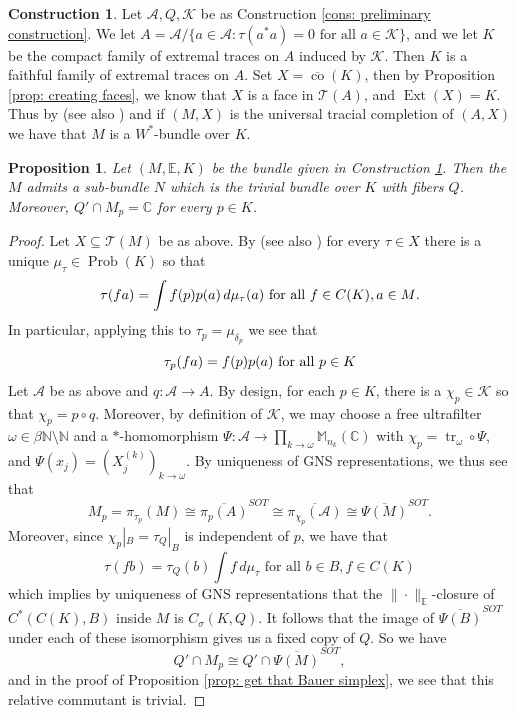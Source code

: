\documentclass[10pt]{amsart}
\newtheorem{prop}[thm]{Proposition}
\theoremstyle{definition}
\newtheorem{cons}[thm]{Construction}
\numberwithin{equation}{section}
\newcommand{\bC}{{\mathbb C}}
\newcommand{\bE}{{\mathbb E}}
\newcommand{\bM}{{\mathbb M}}
\newcommand{\bN}{{\mathbb N}}
\newcommand{\cA}{{\mathcal A}}
\newcommand{\cK}{{\mathcal K}}
\newcommand{\cT}{{\mathcal T}}
\DeclareMathOperator{\tr}{tr}
\DeclareMathOperator{\Ext}{Ext}
\DeclareMathOperator{\Prob}{Prob}
\DeclareMathOperator{\co}{co}
\begin{document}
\begin{cons}\label{cons: defining the bundle}
Let $\cA,Q,\cK$ be as Construction \ref{cons: preliminary construction}.
We let $A=\cA/\{a\in \cA:\tau(a^{*}a)=0 \text{ for all $a\in \cK$}\}$, and we let $K$ be the compact family of extremal traces on $A$ induced by $\cK$. Then $K$ is a faithful family of extremal traces on $A$. Set $X=\overline{\co}(K)$, then by Proposition \ref{prop: creating faces}, we know that $X$ is a face in $\cT(A)$, and $\Ext(X)=K$.  Thus by \cite[Theorem 3]{OzawaBundle} (see also \cite[Theorem 3.37]{TraciallyComplete}) and \cite[Proposition 3.23 (ii) and (iv)]{TraciallyComplete} if $(M,X)$ is the universal tracial completion of $(A,X)$ we have that $M$ is a $W^{*}$-bundle over $K$. 
\end{cons}

\begin{prop}\label{prop: relative commutant condition bundle}
Let $(M,\bE,K)$ be the bundle given in Construction \ref{cons: defining the bundle}. Then the $M$ admits a sub-bundle $N$ which is the trivial bundle over $K$ with fibers $Q$. Moreover, $Q'\cap M_{p}=\bC$ for every $p\in K$.     
\end{prop}

\begin{proof}
Let $X\subseteq \cT(M)$ be as above. By \cite[Theorem 3]{OzawaBundle} (see also \cite[Theorem 3.37]{TraciallyComplete}) for every $\tau\in X$ there is a unique $\mu_{\tau}\in \Prob(K)$ so that 
\[\tau(fa)=\int f(p)p(a)\,d\mu_{\tau}(a)\textnormal{ for all $f\in C(K),a\in M$}.\]
In particular, applying this to $\tau_{p}=\mu_{\delta_{p}}$ we see that 
\[\tau_{p}(fa)=f(p)p(a) \textnormal{ for all $p\in K$}\]
Let $\cA$ be as above and $q\colon \cA\to A$. By design, for each $p\in K$, there is a $\chi_{p}\in \cK$ so that $\chi_{p}=p\circ q$. Moreover, by definition of $\cK$, we may choose a free ultrafilter $\omega\in \beta\bN\setminus\bN$ and a $*$-homomorphism $\Psi\colon\cA\to \prod_{k\to\omega}\bM_{n_{k}}(\bC)$ with $\chi_{p}=\tr_{\omega}\circ \Psi$, and $\Psi(x_{j})=(X^{(k)}_{j})_{k\to\omega}$. By uniqueness of GNS representations, we thus see that 
\[M_{p}=\pi_{\tau_{p}}(M)\cong \overline{\pi_{p}(A)}^{SOT}\cong\overline{\pi_{\chi_{p}}(\cA)}\cong \overline{\Psi(M)}^{SOT}.\]
Moreover, since $\chi_{p}|_{B}=\tau_{Q}|_{B}$ is independent of $p$, we have that 
\[\tau(fb)=\tau_{Q}(b)\int f\,d\mu_{\tau} \text{ for all $b\in B,f\in C(K)$}\]
which implies by uniqueness of GNS representations that the $\|\cdot\|_{\bE}$-closure of $C^{*}(C(K),B)$ inside $M$ is $C_{\sigma}(K,Q)$. It follows that the image of $\overline{\Psi(B)}^{SOT}$ under each of these isomorphism gives us a fixed copy of $Q$. So we have 
\[Q'\cap M_{p}\cong Q'\cap \overline{\Psi(M)}^{SOT},\]
and in the proof of Proposition \ref{prop: get that Bauer simplex}, we see that this relative commutant is trivial. 
\end{proof}
\end{document}

